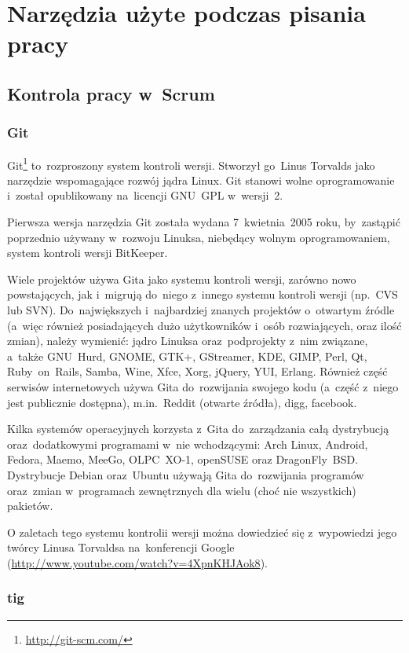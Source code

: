 \section{Narzędzia użyte podczas pisania pracy}

\subsection{Kontrola pracy w~Scrum}

\subsubsection{Git}

Git\footnote{\url{http://git-scm.com/}} to~rozproszony system kontroli wersji. Stworzył go~Linus Torvalds jako narzędzie wspomagające rozwój jądra Linux. Git stanowi wolne oprogramowanie i~został opublikowany na~licencji GNU~GPL w~wersji~2.


Pierwsza wersja narzędzia Git została wydana 7~kwietnia~2005 roku, by~zastąpić poprzednio używany w~rozwoju Linuksa, niebędący wolnym oprogramowaniem, system kontroli wersji BitKeeper.


Wiele projektów używa Gita jako systemu kontroli wersji, zarówno nowo powstających, jak i~migrują do~niego z~innego systemu kontroli wersji (np.~CVS lub SVN). Do~największych i~najbardziej znanych projektów o~otwartym źródle (a~więc również posiadających dużo użytkowników i~osób rozwiających, oraz ilość zmian), należy wymienić: jądro Linuksa oraz~podprojekty z~nim związane, a~także GNU~Hurd, GNOME, GTK+, GStreamer, KDE, GIMP, Perl, Qt, Ruby~on~Rails, Samba, Wine, Xfce, Xorg, jQuery, YUI, Erlang. Również część serwisów internetowych używa Gita do~rozwijania swojego kodu (a~część z~niego jest publicznie dostępna), m.in.~Reddit (otwarte źródła), digg, facebook.


Kilka systemów operacyjnych korzysta z~Gita do~zarządzania całą dystrybucją oraz~dodatkowymi programami w~nie wchodzącymi: Arch Linux, Android, Fedora, Maemo, MeeGo, OLPC~XO-1, openSUSE oraz DragonFly~BSD. Dystrybucje Debian oraz~Ubuntu używają Gita do~rozwijania programów oraz~zmian w~programach zewnętrznych dla wielu (choć nie wszystkich) pakietów.


O zaletach tego systemu kontrolii wersji można dowiedzieć się z~wypowiedzi jego twórcy Linusa Torvaldsa na~konferencji Google (\url{http://www.youtube.com/watch?v=4XpnKHJAok8}).

\subsubsection{tig}

